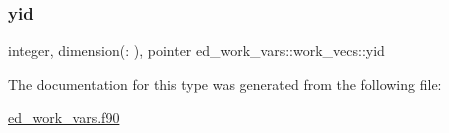 \subsubsection{\texorpdfstring{yid}{yid}}
{\footnotesize\ttfamily integer, dimension(\+:  ), pointer ed\+\_\+work\+\_\+vars\+::work\+\_\+vecs\+::yid}



The documentation for this type was generated from the following file\+:\begin{DoxyCompactItemize}
\item 
\hyperlink{ed__work__vars_8f90}{ed\+\_\+work\+\_\+vars.\+f90}\end{DoxyCompactItemize}
